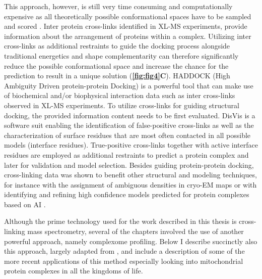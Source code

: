 This approach, however, is still very time consuming and computationally expensive as all theoretically possible conformational spaces have to be sampled and scored \cite{Dominguez_2003, van_Zundert_2016}. Inter protein cross-links identified in XL-MS experiments, provide information about the arrangement of proteins within a complex. Utilizing inter cross-links as additional restraints to guide the docking process alongside traditional energetics and shape complementarity can therefore significantly reduce the possible conformational space and increase the chance for the prediction to result in a unique solution \cite{Dominguez_2003, van_Zundert_2016} (\textbf{\autoref{fig:fig4}C}). HADDOCK \cite{Dominguez_2003, Orban-Nemeth_2018} (High Ambiguity Driven protein-protein Docking) is a powerful tool that can make use of biochemical and/or biophysical interaction data such as inter cross-links observed in XL-MS experiments. To utilize cross-links for guiding structural docking, the provided information content needs to be first evaluated. DisVis \cite{van_Zundert_2015} is a software suit enabling the identification of false-positive cross-links as well as the characterization of surface residues that are most often contacted in all possible models (interface residues). True-positive cross-links together with active interface residues are employed as additional restraints to predict a protein complex and later for validation and model selection. Besides guiding protein-protein docking, cross-linking data was shown to benefit other structural and modeling techniques, for instance with the assignment of ambiguous densities in cryo-EM maps \cite{Herzog_2012, Kyrilis_2021b} or with identifying and refining high confidence models predicted for protein complexes based on AI \cite{Burke_2021}.

Although the prime technology used for the work described in this thesis is cross-linking mass spectrometry, several of the chapters involved the use of another powerful approach, namely complexome profiling. Below I describe succinctly also this approach, largely adapted from \cite{Cabrera-Orefice_2022}, and include a description of some of the more recent applications of this method especially looking into mitochondrial protein complexes in all the kingdoms of life.
%
